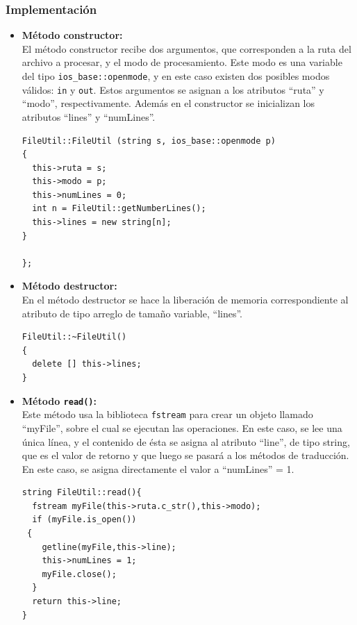 \subsubsection{Implementación}

\begin{itemize}
\item \textbf{Método constructor:}\\
El método constructor recibe dos argumentos, que corresponden a la ruta del archivo a procesar, y el modo de procesamiento. Este modo es una variable del tipo \texttt{ios\_base::openmode}, y en este caso existen dos posibles modos válidos: \texttt{in} y \texttt{out}. Estos argumentos se asignan a los atributos ``ruta'' y ``modo'', respectivamente. Además en el constructor se inicializan los atributos ``lines'' y ``numLines''.


\begin{verbatim}
FileUtil::FileUtil (string s, ios_base::openmode p)
{
  this->ruta = s;
  this->modo = p;
  this->numLines = 0;
  int n = FileUtil::getNumberLines();
  this->lines = new string[n];
}

};
\end{verbatim}

\item \textbf{Método destructor:}\\
En el método destructor se hace la liberación de memoria correspondiente al atributo de tipo arreglo de tamaño variable, ``lines''.
\begin{verbatim}
FileUtil::~FileUtil()
{
  delete [] this->lines;
}
\end{verbatim}


\item \textbf{Método \texttt{read()}:}\\

Este método usa la biblioteca \texttt{fstream} para crear un objeto llamado ``myFile'', sobre el cual se ejecutan las operaciones. En este caso, se lee una única línea, y el contenido de ésta se asigna al atributo ``line'', de tipo string, que es el valor de retorno y que luego se pasará a los métodos de traducción. En este caso, se asigna directamente el valor a ``numLines'' = 1. 

\begin{verbatim}
string FileUtil::read(){
  fstream myFile(this->ruta.c_str(),this->modo);
  if (myFile.is_open())
 {
    getline(myFile,this->line);
    this->numLines = 1;
    myFile.close();
  }
  return this->line;
}
\end{verbatim}


\end{itemize}
